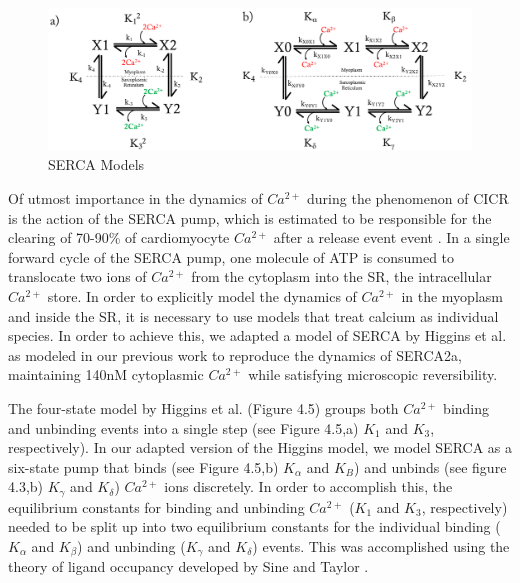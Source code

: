 \documentclass[12pt]{ucsddissertation}
\begin{document}
\setcounter{figure}{4}
\begin{figure}
\centering
	\includegraphics[scale=0.73]{SERCA2_fig.png}
	\caption{SERCA Models}
\label{fig:SERCAHiggins} 
\end{figure}


 Of utmost importance in the dynamics of $Ca^{2+}$ during the phenomenon of CICR is the action of the SERCA pump, which is estimated to be responsible for the clearing of 70-90\% of cardiomyocyte $Ca^{2+}$ after a release event event \cite{Bers2002}. In a single forward cycle of the SERCA pump, one molecule of ATP is consumed to translocate two ions of $Ca^{2+}$ from the cytoplasm into the SR, the intracellular $Ca^{2+}$ store.  In order to explicitly model the dynamics of $Ca^{2+}$ in the myoplasm and inside the SR, it is necessary to use models that treat calcium as individual species. In order to achieve this, we adapted a model of SERCA by Higgins et al. \cite{Higgins2006} as modeled in our previous work \cite{Bartol2015} to reproduce the dynamics of SERCA2a, maintaining 140nM cytoplasmic $Ca^{2+}$ while satisfying microscopic reversibility. 

The four-state model by Higgins et al. \cite{Higgins2006} (Figure 4.5) groups both $Ca^{2+}$ binding and unbinding events into a single step (see Figure 4.5,a) $K_{1}$ and $K_{3}$, respectively). In our adapted version of the Higgins model, we model SERCA as a six-state pump that binds (see Figure 4.5,b) $K_{\alpha}$ and $K_{B}$) and unbinds (see figure 4.3,b) $K_{\gamma}$ and $K_{\delta}$) $Ca^{2+}$ ions discretely. In order to accomplish this, the equilibrium constants for binding and unbinding $Ca^{2+}$  ($K_{1}$ and $K_{3}$, respectively) needed to be split up into two equilibrium constants for the individual binding ($K_{\alpha}$ and $K_{\beta}$) and unbinding ($K_{\gamma}$ and $K_{\delta}$) events. This was accomplished using the theory of ligand occupancy developed by Sine and Taylor \cite{Sine1979,Sine1980,Sine1981}. 
\end{document}
